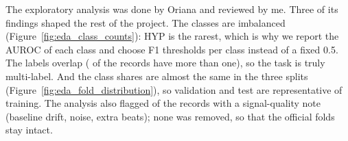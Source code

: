 The exploratory analysis was done by Oriana and reviewed by me. Three of its findings shaped the rest of
the project. The classes are imbalanced (Figure~\ref{fig:eda_class_counts}): HYP is the rarest, which is
why we report the AUROC of each class and choose F1 thresholds per class instead of a fixed 0.5. The
labels overlap (\edaFracMultilabelAllPct{} of the records have more than one), so the task is truly
multi-label. And the class shares are almost the same in the three splits
(Figure~\ref{fig:eda_fold_distribution}), so validation and test are representative of training. The
analysis also flagged \edaFracAnyQualityFlagAllPct{} of the records with a signal-quality note (baseline
drift, noise, extra beats); none was removed, so that the official folds stay intact.


